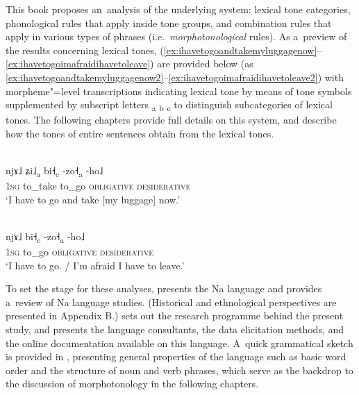 This book proposes an~analysis of the underlying system: lexical tone categories, phonological rules that apply inside tone groups, and combination rules that apply in various types of phrases (i.e.\ \textit{morphotonological} rules). As a~preview of the results concerning lexical tones,
(\ref{ex:ihavetogoandtakemyluggagenow}--\ref{ex:ihavetogoimafraidihavetoleave}) are provided below
(as \ref{ex:ihavetogoandtakemyluggagenow2}--\ref{ex:ihavetogoimafraidihavetoleave2}) with
morpheme"=level transcriptions indicating lexical tone by means of tone symbols supplemented by
subscript letters \textsubscript{a} \textsubscript{b} \textsubscript{c} to distinguish {subcategories} of lexical tones. The following chapters provide full details on this system, and describe how the tones of entire sentences obtain from the lexical tones. 


\begin{exe}
\ex
\begin{xlist}
\ex
\label{ex:ihavetogoandtakemyluggagenow2}
\\
\gll njɤ˩ 	ʑi˩\textsubscript{a}		bi˧\textsubscript{c}	-zo˧\textsubscript{a}		-ho˩\\
\textsc{1sg}	to\_take		to\_go	\textsc{obligative}	\textsc{desiderative}\\
\glt ‘I have to go and take [my luggage] now.' 

\ex
\label{ex:ihavetogoimafraidihavetoleave2}
\\
\gll njɤ˩ 	bi˧\textsubscript{c}	-zo˧\textsubscript{a}		-ho˩\\
\textsc{1sg}	to\_go	\textsc{obligative}	\textsc{desiderative}\\
\glt ‘I have to go. / I’m afraid I have to leave.'
\end{xlist}
\end{exe}

To set the stage for these analyses,
 presents the Na language and provides a~review of Na language studies. (Historical and ethnological perspectives are presented in Appendix B.)  sets out the research programme behind the present study, and presents the
language consultants, the data elicitation methods, and the online documentation available on this
language. A~quick grammatical sketch is provided in , presenting general properties of the language such as basic word order and the structure of {noun} and {verb} phrases, which serve as the backdrop to the discussion of morphotonology in the following chapters. 


